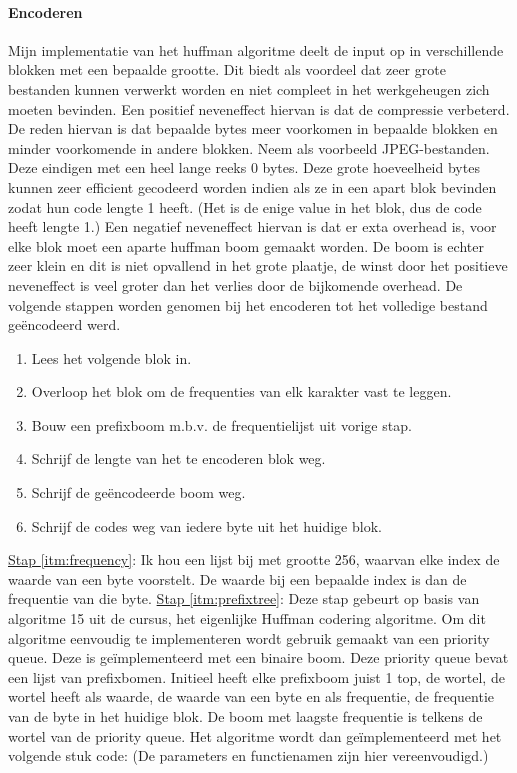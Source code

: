 \documentclass[11pt, a4paper]{article}
\begin{document}
\paragraph{Encoderen}
Mijn implementatie van het huffman algoritme deelt de input op in verschillende blokken met een bepaalde grootte. Dit biedt als voordeel dat zeer grote bestanden kunnen verwerkt worden en niet compleet in het werkgeheugen zich moeten bevinden. Een positief neveneffect hiervan is dat de compressie verbeterd. De reden hiervan is dat bepaalde bytes meer voorkomen in bepaalde blokken en minder voorkomende in andere blokken. Neem als voorbeeld JPEG-bestanden. Deze eindigen met een heel lange reeks 0 bytes. Deze grote hoeveelheid bytes kunnen zeer efficient gecodeerd worden indien als ze in een apart blok bevinden zodat hun code lengte 1 heeft. (Het is de enige value in het blok, dus de code heeft lengte 1.) Een negatief neveneffect hiervan is dat er exta overhead is, voor elke blok moet een aparte huffman boom gemaakt worden. De boom is echter zeer klein en dit is niet opvallend in het grote plaatje, de winst door het positieve neveneffect is veel groter dan het verlies door de bijkomende overhead. De volgende stappen worden genomen bij het encoderen tot het volledige bestand ge\"{e}ncodeerd werd.
\begin{enumerate}
	\item \label{itm:read} Lees het volgende blok in. 
	\item \label{itm:frequency} Overloop het blok om de frequenties van elk karakter vast te leggen.
	\item \label{itm:prefixtree} Bouw een prefixboom m.b.v. de frequentielijst uit vorige stap.
	\item \label{itm:writelength} Schrijf de lengte van het te encoderen blok weg. 
	\item \label{itm:writetree} Schrijf de ge\"{e}ncodeerde boom weg.
	\item \label{itm:writecode} Schrijf de codes weg van iedere byte uit het huidige blok.
\end{enumerate}
\underline{Stap \ref{itm:frequency}}: Ik hou een lijst bij met grootte 256, waarvan elke index de waarde van een byte voorstelt. De waarde bij een bepaalde index is dan de frequentie van die byte.
\newline\underline{Stap \ref{itm:prefixtree}}: Deze stap gebeurt op basis van algoritme 15 uit de cursus, het eigenlijke Huffman codering algoritme. Om dit algoritme eenvoudig te implementeren wordt gebruik gemaakt van een priority queue. Deze is ge\"{i}mplementeerd met een binaire boom. Deze priority queue bevat een lijst van prefixbomen. Initieel heeft elke prefixboom juist 1 top, de wortel, de wortel heeft als waarde, de waarde van een byte en als frequentie, de frequentie van de byte in het huidige blok. De boom met laagste frequentie is telkens de wortel van de priority queue. Het algoritme wordt dan ge\"{i}mplementeerd met het volgende stuk code: (De parameters en functienamen zijn hier vereenvoudigd.) 
\end{document}
